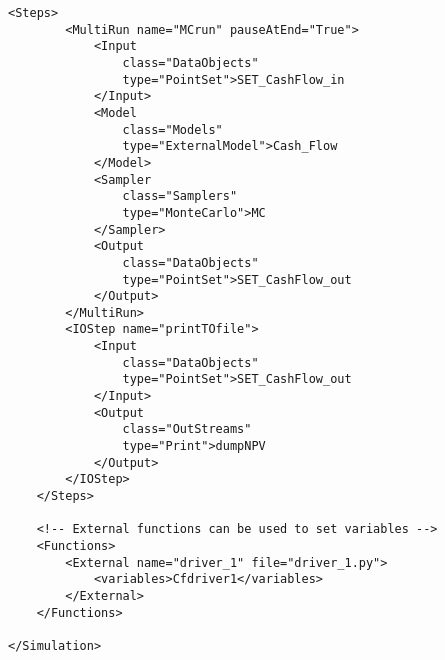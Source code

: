 \begin{lstlisting}[style=XML,morekeywords={anAttribute},caption=Raven input example using CashFlow \texttt{ExternalModel}., label=lst:RAVENExample]
    <Steps>
        <MultiRun name="MCrun" pauseAtEnd="True">
            <Input
                class="DataObjects"
                type="PointSet">SET_CashFlow_in
            </Input>
            <Model
                class="Models"
                type="ExternalModel">Cash_Flow
            </Model>
            <Sampler
                class="Samplers"
                type="MonteCarlo">MC
            </Sampler>
            <Output
                class="DataObjects"
                type="PointSet">SET_CashFlow_out
            </Output>
        </MultiRun>
        <IOStep name="printTOfile">
            <Input
                class="DataObjects"
                type="PointSet">SET_CashFlow_out
            </Input>
            <Output
                class="OutStreams"
                type="Print">dumpNPV
            </Output>
        </IOStep>
    </Steps>

    <!-- External functions can be used to set variables -->
    <Functions>
        <External name="driver_1" file="driver_1.py">
            <variables>Cfdriver1</variables>
        </External>
    </Functions>

</Simulation>
\end{lstlisting}

